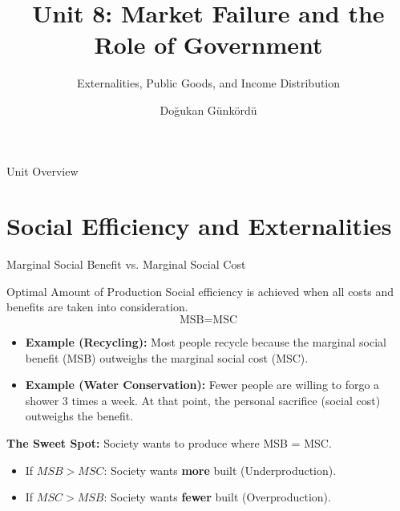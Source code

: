 \documentclass{beamer}
\title{Unit 8: Market Failure and the Role of Government}
\subtitle{Externalities, Public Goods, and Income Distribution}
\author{Doğukan Günkördü}
\date{}
\begin{document}
\begin{frame}
    \titlepage
\end{frame}

\begin{frame}{Unit Overview}
    \tableofcontents
\end{frame}

\section{Social Efficiency and Externalities}

\begin{frame}{Marginal Social Benefit vs. Marginal Social Cost}
    \begin{block}{Optimal Amount of Production}
        Social efficiency is achieved when all costs and benefits are taken into consideration.
        \[ \text{MSB} = \text{MSC} \]
    \end{block}

    \begin{itemize}
        \item \textbf{Example (Recycling):} Most people recycle because the marginal social benefit (MSB) outweighs the marginal social cost (MSC).
        \item \textbf{Example (Water Conservation):} Fewer people are willing to forgo a shower 3 times a week. At that point, the personal sacrifice (social cost) outweighs the benefit.
    \end{itemize}
    
    \vspace{0.5cm}
    \textbf{The Sweet Spot:}
    Society wants to produce where MSB = MSC. 
    \begin{itemize}
        \item If $MSB > MSC$: Society wants \textbf{more} built (Underproduction).
        \item If $MSC > MSB$: Society wants \textbf{fewer} built (Overproduction).
    \end{itemize}
\end{frame}
\end{document}
